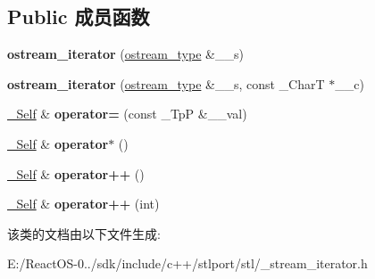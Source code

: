 \subsection*{Public 成员函数}
\begin{DoxyCompactItemize}
\item 
\mbox{\label{classostream__iterator_a13675cbe24506500bb6d75c5031335f8}} 
{\bfseries ostream\+\_\+iterator} (\hyperlink{classbasic__ostream}{ostream\+\_\+type} \&\+\_\+\+\_\+s)
\item 
\mbox{\label{classostream__iterator_ab9b4adce9c91afdcb67061ec945fe01e}} 
{\bfseries ostream\+\_\+iterator} (\hyperlink{classbasic__ostream}{ostream\+\_\+type} \&\+\_\+\+\_\+s, const \+\_\+\+CharT $\ast$\+\_\+\+\_\+c)
\item 
\mbox{\label{classostream__iterator_ab884d4f807a14c13704d108dc4b471c9}} 
\hyperlink{classostream__iterator}{\+\_\+\+Self} \& {\bfseries operator=} (const \+\_\+\+TpP \&\+\_\+\+\_\+val)
\item 
\mbox{\label{classostream__iterator_a314a9957f7af141b33be213a4234a412}} 
\hyperlink{classostream__iterator}{\+\_\+\+Self} \& {\bfseries operator$\ast$} ()
\item 
\mbox{\label{classostream__iterator_a5f80cdfa817eb757d5697dc212e78ef7}} 
\hyperlink{classostream__iterator}{\+\_\+\+Self} \& {\bfseries operator++} ()
\item 
\mbox{\label{classostream__iterator_a25d33ae81fe8919c62ff0da5a96e7248}} 
\hyperlink{classostream__iterator}{\+\_\+\+Self} \& {\bfseries operator++} (int)
\end{DoxyCompactItemize}


该类的文档由以下文件生成\+:\begin{DoxyCompactItemize}
\item 
E\+:/\+React\+O\+S-\/0../sdk/include/c++/stlport/stl/\+\_\+stream\+\_\+iterator.\+h\end{DoxyCompactItemize}
